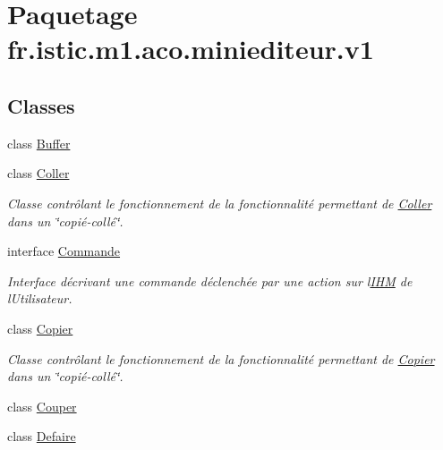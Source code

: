 \hypertarget{namespacefr_1_1istic_1_1m1_1_1aco_1_1miniediteur_1_1v1}{}\section{Paquetage fr.\+istic.\+m1.\+aco.\+miniediteur.\+v1}
\label{namespacefr_1_1istic_1_1m1_1_1aco_1_1miniediteur_1_1v1}
\subsection*{Classes}
\begin{DoxyCompactItemize}
\item 
class \hyperlink{classfr_1_1istic_1_1m1_1_1aco_1_1miniediteur_1_1v1_1_1Buffer}{Buffer}
\item 
class \hyperlink{classfr_1_1istic_1_1m1_1_1aco_1_1miniediteur_1_1v1_1_1Coller}{Coller}
\begin{DoxyCompactList}\small\item\em Classe contrôlant le fonctionnement de la fonctionnalité permettant de \hyperlink{classfr_1_1istic_1_1m1_1_1aco_1_1miniediteur_1_1v1_1_1Coller}{Coller} dans un \char`\"{}copié-\/collé\char`\"{}. \end{DoxyCompactList}\item 
interface \hyperlink{interfacefr_1_1istic_1_1m1_1_1aco_1_1miniediteur_1_1v1_1_1Commande}{Commande}
\begin{DoxyCompactList}\small\item\em Interface décrivant une commande déclenchée par une action sur l\textquotesingle{}\hyperlink{interfacefr_1_1istic_1_1m1_1_1aco_1_1miniediteur_1_1v1_1_1IHM}{I\+HM} de l\textquotesingle{}Utilisateur. \end{DoxyCompactList}\item 
class \hyperlink{classfr_1_1istic_1_1m1_1_1aco_1_1miniediteur_1_1v1_1_1Copier}{Copier}
\begin{DoxyCompactList}\small\item\em Classe contrôlant le fonctionnement de la fonctionnalité permettant de \hyperlink{classfr_1_1istic_1_1m1_1_1aco_1_1miniediteur_1_1v1_1_1Copier}{Copier} dans un \char`\"{}copié-\/collé\char`\"{}. \end{DoxyCompactList}\item 
class \hyperlink{classfr_1_1istic_1_1m1_1_1aco_1_1miniediteur_1_1v1_1_1Couper}{Couper}
\item 
class \hyperlink{classfr_1_1istic_1_1m1_1_1aco_1_1miniediteur_1_1v1_1_1Defaire}{Defaire}

\end{DoxyCompactItemize}
